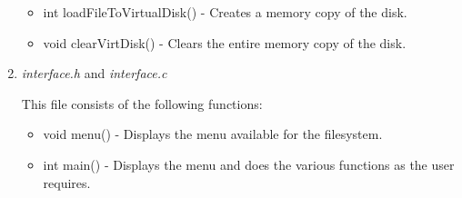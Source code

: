 \begin{enumerate}
\begin{itemize}
		\item int loadFileToVirtualDisk() - Creates a memory copy of the disk.
		
		\item void clearVirtDisk() - Clears the entire memory copy of the disk.
	\end{itemize}
	
	\item \textit{interface.h} and \textit{interface.c}
	
	This file consists of the following functions:
	\begin{itemize}
		\item void menu() - Displays the menu available for the filesystem.
		\item int main() - Displays the menu and does the various functions as the user requires.	
	\end{itemize}
\end{enumerate}